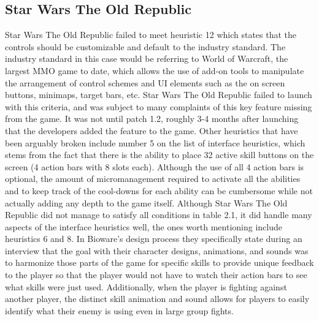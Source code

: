 \documentclass[12pt]{report}
\begin{document}
\subsection{Star Wars The Old Republic}
Star Wars The Old Republic failed to meet heuristic 12 which states that the controls should be customizable and default to the industry standard. The industry standard in this case would be referring to World of Warcraft, the largest MMO game to date, which allows the use of add-on tools to manipulate the arrangement of control schemes and UI elements such as the on screen buttons, minimaps, target bars, etc. Star Wars The Old Republic failed to launch with this criteria, and was subject to many complaints of this key feature missing from the game. It was not until patch 1.2, roughly 3-4 months after launching that the developers added the feature to the game. Other heuristics that have been arguably broken include number 5 on the list of interface heuristics, which stems from the fact that there is the ability to place 32 active skill buttons on the screen (4 action bars with 8 slots each). Although the use of all 4 action bars is optional, the amount of micromanagement required to activate all the abilities and to keep track of the cool-downs for each ability can be cumbersome while not actually adding any depth to the game itself. Although Star Wars The Old Republic did not manage to satisfy all conditions in table 2.1, it did handle many aspects of the interface heuristics well, the ones worth mentioning include heuristics 6 and 8. In Bioware's design process they specifically state during an interview that the goal with their character designs, animations, and sounds was to harmonize those parts of the game for specific skills to provide unique feedback to the player so that the player would not have to watch their action bars to see what skills were just used. Additionally, when the player is fighting against another player, the distinct skill animation and sound allows for players to easily identify what their enemy is using even in large group fights.
\end{document}
